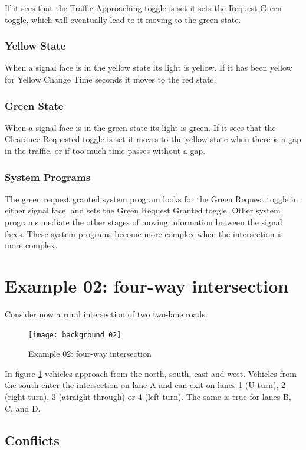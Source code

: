\documentclass[letterpaper,twoside]{article}
\begin{document}
If it sees that the Traffic Approaching toggle is set it sets
the Request Green toggle, which will eventually lead to it moving
to the green state.

\subsubsection{Yellow State}
When a signal face is in the yellow state its light is yellow.
If it has been yellow for Yellow Change Time seconds it moves
to the red state.

\subsubsection{Green State}
When a signal face is in the green state its light is green.
If it sees that the Clearance Requested toggle is set it moves to the
yellow state when there is a gap in the traffic, or if too much time
passes without a gap.

\subsubsection{System Programs}

The green request granted system program looks for the Green Request
toggle in either signal face, and sets the Green Request Granted
toggle.  Other system programs mediate the other stages of moving
information between the signal faces.  These system programs become
more complex when the intersection is more complex.

\section{Example 02: four-way intersection}

Consider now a rural intersection of two two-lane roads.

\begin{figure}[htb]
  {\texttt{[image: background\_02]}}
  {\caption{Example 02: four-way intersection}
    \label{fig:four-way_intersection}}
\end{figure}

In figure \ref{fig:four-way_intersection} vehicles approach from the
north, south, east and west.  Vehicles from the south enter the intersection
on lane A and can exit on lanes 1 (U-turn), 2 (right turn), 3 (atraight
through) or 4 (left turn).  The same is true for lanes B, C, and D.

\subsection{Conflicts}
\end{document}
